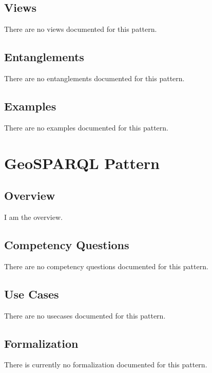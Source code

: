 \subsection{Views}
\label{ssec:views}
There are no views documented for this pattern.


\subsection{Entanglements}
\label{ssec:entanglements}
There are no entanglements documented for this pattern.

\subsection{Examples}
\label{ssec:examples}
There are no examples documented for this pattern.


\section{GeoSPARQL Pattern}
\label{sec:geosparql-pattern}
\subsection{Overview}
\label{ssec:overview}
I am the overview.

\subsection{Competency Questions}
\label{ssec:cqs}
There are no competency questions documented for this pattern.

\subsection{Use Cases}
\label{ssec:use-cases}
There are no usecases documented for this pattern.
\subsection{Formalization}
\label{ssec:formalization}
There is currently no formalization documented for this pattern.


